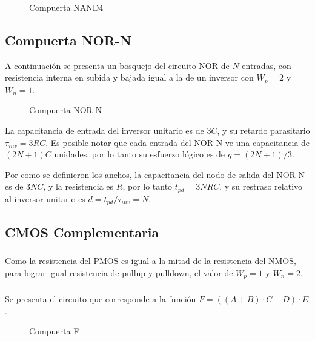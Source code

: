 \documentclass[letterpaper, 12pt]{article}
\numberwithin{equation}{section}
\begin{document}
\begin{figure}[H]
  \centering
  
  \caption{Compuerta NAND4}
\end{figure}

\subsection{Compuerta NOR-N}

A continuación se presenta un bosquejo del circuito NOR de \(N\) entradas, con resistencia interna en subida y bajada igual a la de un inversor con \(W_p = 2\) y \(W_n = 1\).

\begin{figure}[H]
  \centering
  
  \caption{Compuerta NOR-N}
\end{figure}

La capacitancia de entrada del inversor unitario es de \(3C\), y su retardo parasitario \(\tau_{inv} = 3RC\). Es posible notar que cada entrada del NOR-N ve una capacitancia de \((2N + 1)C\) unidades, por lo tanto su esfuerzo lógico es de \(g = (2N+1)/3\).

Por como se definieron los anchos, la capacitancia del nodo de salida del NOR-N es de \(3NC\), y la resistencia es \(R\), por lo tanto \(t_{pd} = 3NRC\), y su restraso relativo al inversor unitario es \(d = t_{pd} / \tau_{inv} =  N\).

\subsection{CMOS Complementaria}

\subsubsection{}

Como la resistencia del PMOS es igual a la mitad de la resistencia del NMOS, para lograr igual resistencia de pullup y pulldown, el valor de \(W_p = 1\) y \(W_n = 2\).

\subsubsection{}

Se presenta el circuito que corresponde a la función \(F = \overline{((A+B)\cdot C + D)\cdot E}\).

\begin{figure}[H]
  \centering
  
  \caption{Compuerta F}
\end{figure}
\end{document}
